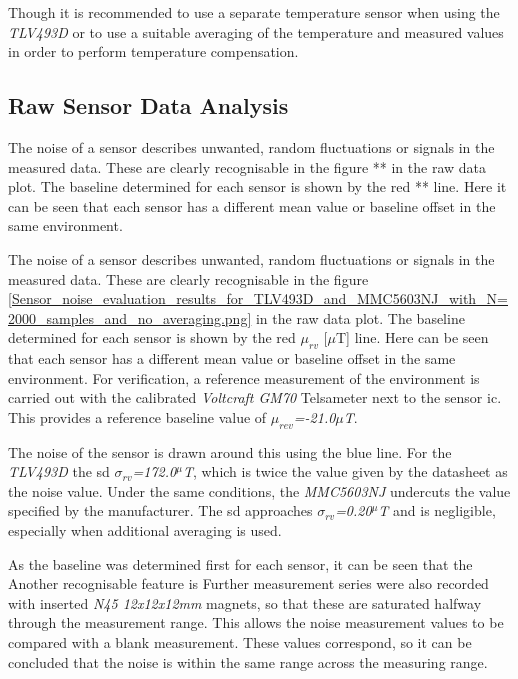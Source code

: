 Though it is recommended to use a separate temperature sensor when using
the \emph{TLV493D} or to use a suitable averaging of the temperature and
measured values in order to perform temperature compensation.

\hypertarget{raw-sensor-data-analysis}{%
\subsection{Raw Sensor Data Analysis}\label{raw-sensor-data-analysis}}

The noise of a sensor describes unwanted, random fluctuations or signals
in the measured data. These are clearly recognisable in the figure ** in
the raw data plot. The baseline determined for each sensor is shown by
the red ** line. Here it can be seen that each sensor has a different
mean value or baseline offset in the same environment.

The noise of a sensor describes unwanted, random fluctuations or signals
in the measured data. These are clearly recognisable in the figure
\ref{Sensor_noise_evaluation_results_for_TLV493D_and_MMC5603NJ_with_N=2000_samples_and_no_averaging.png}
in the raw data plot. The baseline determined for each sensor is shown
by the red \(\mu_{rv}\) {[}\(\mu\)T{]} line. Here can be seen that each
sensor has a different mean value or baseline offset in the same
environment. For verification, a reference measurement of the
environment is carried out with the calibrated \emph{Voltcraft GM70}
Telsameter next to the sensor \gls{ic}. This provides a reference
baseline value of \emph{\(\mu_{rev}\)=-21.0\(\mu\)T}.

The noise of the sensor is drawn around this using the blue line. For
the \emph{TLV493D} the \gls{sd} \emph{\(\sigma_{rv}\)=172.0\(^{\mu}\)T},
which is twice the value given by the datasheet as the noise value.
Under the same conditions, the \emph{MMC5603NJ} undercuts the value
specified by the manufacturer. The \gls{sd} approaches
\emph{\(\sigma_{rv}\)=0.20\(^{\mu}\)T} and is negligible, especially
when additional averaging is used.

As the baseline was determined first for each sensor, it can be seen
that the Another recognisable feature is Further measurement series were
also recorded with inserted \emph{N45 12x12x12mm} magnets, so that these
are saturated halfway through the measurement range. This allows the
noise measurement values to be compared with a blank measurement. These
values correspond, so it can be concluded that the noise is within the
same range across the measuring range.

